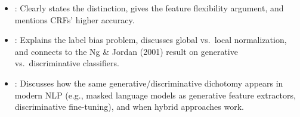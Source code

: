 \begin{interviewq}

\goodgreat
\begin{itemize}
    \item {}: Clearly states the distinction, gives the feature
          flexibility argument, and mentions CRFs' higher accuracy.
    \item {}: Explains the label bias problem, discusses global
          vs.\ local normalization, and connects to the Ng \& Jordan (2001)
          result on generative vs.\ discriminative classifiers.
    \item {}: Discusses how the same generative/discriminative
          dichotomy appears in modern NLP (e.g., masked language models as
          generative feature extractors, discriminative fine-tuning), and
          when hybrid approaches work.
\end{itemize}

\end{interviewq}

\vspace{0.5em}

